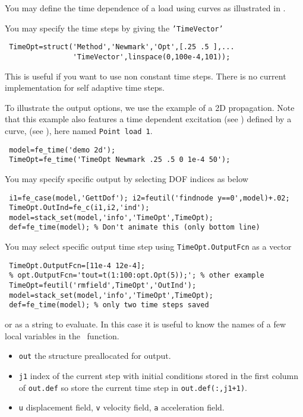 You may define the time dependence of a load using curves as illustrated in .

You may specify the time steps by giving the {\tt 'TimeVector'} 
\begin{verbatim}
 TimeOpt=struct('Method','Newmark','Opt',[.25 .5 ],...
                'TimeVector',linspace(0,100e-4,101));
\end{verbatim}


This is useful if you want to use non constant time steps. There is no current implementation for self adaptive time steps.

To illustrate the output options, we use the example of a 2D propagation. Note that this example also features a time dependent  excitation (see \fecase) defined by a curve, (see \fecurve), here named {\tt Point load 1}.

\begin{verbatim}
 model=fe_time('demo 2d'); 
 TimeOpt=fe_time('TimeOpt Newmark .25 .5 0 1e-4 50');
\end{verbatim}%


You may specify specific output by selecting DOF indices as below 

\begin{verbatim}
 i1=fe_case(model,'GettDof'); i2=feutil('findnode y==0',model)+.02;
 TimeOpt.OutInd=fe_c(i1,i2,'ind');
 model=stack_set(model,'info','TimeOpt',TimeOpt);
 def=fe_time(model); % Don't animate this (only bottom line)
\end{verbatim}%


You may select specific output time step using {\tt TimeOpt.OutputFcn} as a vector

\begin{verbatim}
 TimeOpt.OutputFcn=[11e-4 12e-4];
 % opt.OutputFcn='tout=t(1:100:opt.Opt(5));'; % other example
 TimeOpt=feutil('rmfield',TimeOpt','OutInd');
 model=stack_set(model,'info','TimeOpt',TimeOpt);
 def=fe_time(model); % only two time steps saved
\end{verbatim}%


or as a string to evaluate. In this case it is useful to know the names of a few local variables in the \fetime\ function. 
\begin{itemize}
\item {\tt out} the structure preallocated for output.
\item {\tt j1} index of the current step with initial conditions stored in the first column of {\tt out.def} so store the current time step in {\tt out.def(:,j1+1)}.
\item {\tt u} displacement field, {\tt v} velocity field,  {\tt a} acceleration field.  
\end{itemize}

